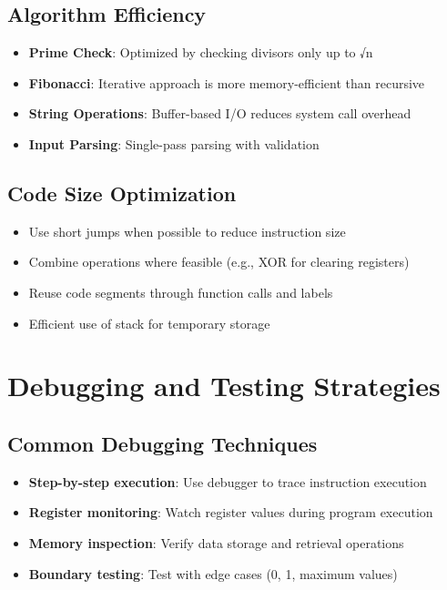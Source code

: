 \documentclass[12pt,a4paper]{article}
\begin{document}
\subsection{Algorithm Efficiency}
\begin{itemize}
\item \textbf{Prime Check}: Optimized by checking divisors only up to √n
\item \textbf{Fibonacci}: Iterative approach is more memory-efficient than recursive
\item \textbf{String Operations}: Buffer-based I/O reduces system call overhead
\item \textbf{Input Parsing}: Single-pass parsing with validation
\end{itemize}

\subsection{Code Size Optimization}
\begin{itemize}
\item Use short jumps when possible to reduce instruction size
\item Combine operations where feasible (e.g., XOR for clearing registers)
\item Reuse code segments through function calls and labels
\item Efficient use of stack for temporary storage
\end{itemize}

\section{Debugging and Testing Strategies}

\subsection{Common Debugging Techniques}
\begin{itemize}
\item \textbf{Step-by-step execution}: Use debugger to trace instruction execution
\item \textbf{Register monitoring}: Watch register values during program execution
\item \textbf{Memory inspection}: Verify data storage and retrieval operations
\item \textbf{Boundary testing}: Test with edge cases (0, 1, maximum values)
\end{itemize}
\end{document}
